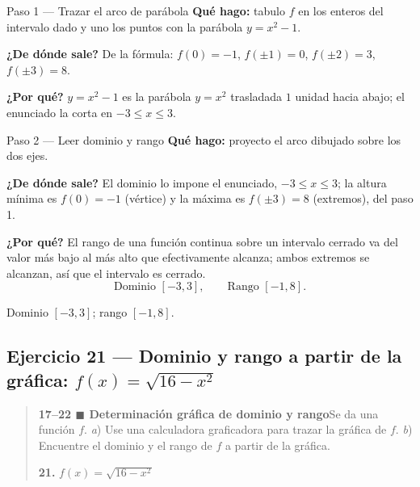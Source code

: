 \documentclass[11pt]{article}
\begin{document}
\begin{paso}{Paso 1 --- Trazar el arco de parábola}
\textbf{Qué hago:} tabulo $f$ en los enteros del intervalo dado y uno los puntos con la parábola $y=x^2-1$.

\textbf{¿De dónde sale?} De la fórmula: $f(0)=-1$, $f(\pm1)=0$, $f(\pm2)=3$, $f(\pm3)=8$.

\textbf{¿Por qué?} $y=x^2-1$ es la parábola $y=x^2$ trasladada $1$ unidad hacia abajo; el enunciado la corta en $-3\le x\le 3$.
\begin{center}
\end{center}
\end{paso}

\begin{paso}{Paso 2 --- Leer dominio y rango}
\textbf{Qué hago:} proyecto el arco dibujado sobre los dos ejes.

\textbf{¿De dónde sale?} El dominio lo impone el enunciado, $-3\le x\le 3$; la altura mínima es $f(0)=-1$ (vértice) y la máxima es $f(\pm3)=8$ (extremos), del paso 1.

\textbf{¿Por qué?} El rango de una función continua sobre un intervalo cerrado va del valor más bajo al más alto que efectivamente alcanza; ambos extremos se alcanzan, así que el intervalo es cerrado.
\[
\text{Dominio } [-3,3], \qquad \text{Rango } [-1,8].
\]
\end{paso}

\begin{resp}
Dominio $[-3,3]$; rango $[-1,8]$.
\end{resp}

\subsection*{Ejercicio 21 — Dominio y rango a partir de la gráfica: $f(x)=\sqrt{16-x^2}$}

\begin{quote}
\textbf{17--22 $\blacksquare$ Determinación gráfica de dominio y rango}\quad Se da una función $f$. \emph{a}) Use una calculadora graficadora para trazar la gráfica de $f$. \emph{b}) Encuentre el dominio y el rango de $f$ a partir de la gráfica.

\textbf{21.} $f(x)=\sqrt{16-x^2}$
\end{quote}
\end{document}
